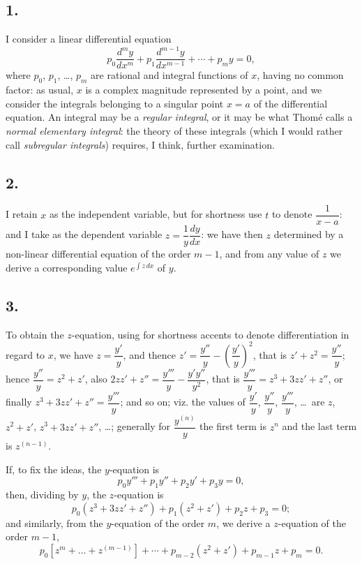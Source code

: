 \documentclass[11pt,a4paper]{article}
\theoremstyle{definition}
\begin{document}
\subsection*{1.}

I consider a linear differential equation
\[
p_0 \frac{d^m y}{dx^m} + p_1 \frac{d^{m-1} y}{dx^{m-1}} + \cdots + p_m y = 0,
\]
where $p_0$, $p_1$, \ldots, $p_m$ are rational and integral functions of $x$, having no common factor: as usual, $x$ is a complex magnitude represented by a point, and we consider the integrals belonging to a singular point $x = a$ of the differential equation. An integral may be a \textit{regular integral}, or it may be what Thom\'e calls a \textit{normal elementary integral}: the theory of these integrals (which I would rather call \textit{subregular integrals}) requires, I think, further examination.

\subsection*{2.}

I retain $x$ as the independent variable, but for shortness use $t$ to denote $\dfrac{1}{x - a}$: and I take as the dependent variable $z = \dfrac{1}{y}\dfrac{dy}{dx}$: we have then $z$ determined by a non-linear differential equation of the order $m - 1$, and from any value of $z$ we derive a corresponding value $e^{\int z\,dx}$ of $y$.

\subsection*{3.}

To obtain the $z$-equation, using for shortness accents to denote differentiation in regard to $x$, we have $z = \dfrac{y'}{y}$, and thence $z' = \dfrac{y''}{y} - \left(\dfrac{y'}{y}\right)^2$, that is $z' + z^2 = \dfrac{y''}{y}$; hence $\dfrac{y''}{y} = z^2 + z'$, also $2zz' + z'' = \dfrac{y'''}{y} - \dfrac{y'y''}{y^2}$, that is $\dfrac{y'''}{y} = z^3 + 3zz' + z''$, or finally $z^3 + 3zz' + z'' = \dfrac{y'''}{y}$; and so on; viz. the values of $\dfrac{y'}{y}$, $\dfrac{y''}{y}$, $\dfrac{y'''}{y}$, \ldots\ are $z$, $z^2 + z'$, $z^3 + 3zz' + z''$, \ldots; generally for $\dfrac{y^{(n)}}{y}$ the first term is $z^n$ and the last term is $z^{(n-1)}$.

If, to fix the ideas, the $y$-equation is
\[
p_0 y''' + p_1 y'' + p_2 y' + p_3 y = 0,
\]
then, dividing by $y$, the $z$-equation is
\[
p_0(z^3 + 3zz' + z'') + p_1(z^2 + z') + p_2 z + p_3 = 0;
\]
and similarly, from the $y$-equation of the order $m$, we derive a $z$-equation of the order $m - 1$,
\[
p_0[z^m + \ldots + z^{(m-1)}] + \cdots + p_{m-2}(z^2 + z') + p_{m-1}z + p_m = 0.
\]
\end{document}

